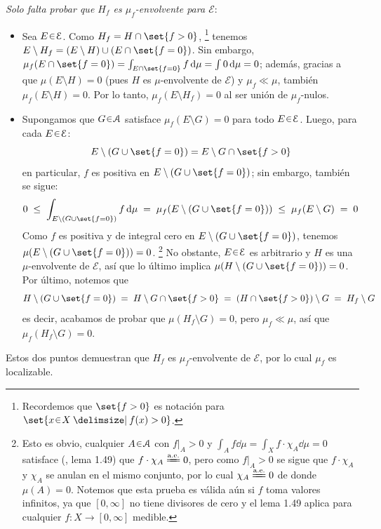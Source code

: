 \begin{sol}
\begin{enumerate}[label = (\roman*), leftmargin=1.8em]
\emph{Solo falta probar que $H_f$ es $\mu_f$-envolvente para $\mathcal{E}$}:
\begin{itemize}[leftmargin=1em]
\item Sea $E\en\mathcal{E}$. Como $H_f = H\cap \set{f>0}$,%
\footnote{
    Recordemos que $\set{f>0}$ es notación para $\set{x\en X \given f(x)>0}$.
}
tenemos $E\setminus H_f = (E \setminus H) \cup (E\cap\set{f=0})$.
Sin embargo, $\mu_f(E\cap\set{f=0}) = \int_{E\cap\set{f=0}}f\dd{\mu} = \int0\dd{\mu}=0$; además, gracias a que $\mu(E\setminus H) = 0$ (pues $H$ es $\mu$-envolvente de $\mathcal{E}$) y $\mu_f \ll \mu$, también $\mu_f(E \setminus H)=0$. Por lo tanto, $\mu_f(E\setminus H_f) = 0$ al ser unión de $\mu_f$-nulos. 
\item 
Supongamos que $G\en\mathcal{A}$ satisface $\mu_f(E\setminus G) = 0$ para todo $E\en\mathcal{E}$. Luego, para cada $E\en\mathcal{E}$:
\[
E \setminus (G\cup \set{f=0}) = E\setminus G \cap \set{f>0}
\]
en particular, $f$ es positiva en $E \setminus (G\cup \set{f=0})$; sin embargo, también se sigue:
\[
0
\;\leq\; \int_{E \setminus (G\cup \set{f=0})}f\dd{\mu}
\;=\; \mu_f(E \setminus (G\cup \set{f=0}))
\;\leq\; \mu_f(E\setminus G)
\;=\; 0
\]
Como $f$ es positiva y de integral cero en $E \setminus (G\cup \set{f=0})$, tenemos $\mu(E \setminus (G\cup \set{f=0}))=0$.%
\footnote{
    Esto es obvio, cualquier $A\en\mathcal{A}$ con $f|_A>0$ y $\int_Af\dd{\mu} = \int_Xf\cdot\chi_A\dd{\mu}=0$ satisface (\cite{Salamon}, lema 1.49) que $f\cdot\chi_A \ctpeq0$, pero como $f|_A >0$ se sigue que $f\cdot\chi_A$ y $\chi_A$ se anulan en el mismo conjunto, por lo cual $\chi_A \ctpeq 0$ de donde $\mu(A)=0$. Notemos que esta prueba es válida aún si $f$ toma valores infinitos, ya que $[0,\infty]$ no tiene divisores de cero y el lema 1.49 aplica para cualquier $f \colon X \to [0,\infty]$ medible.
}
No obstante, $E\en\mathcal{E}$ es arbitrario y $H$ es una $\mu$-envolvente de $\mathcal{E}$, así que lo último implica $\mu(H \setminus (G\cup \set{f=0})) = 0$. Por último, notemos que
\[
H \setminus (G\cup \set{f=0})
\;=\; H \setminus G \cap \set{f>0}
\;=\; (H\cap\set{f>0}) \setminus G
\;=\; H_f \setminus G
\]
es decir, acabamos de probar que $\mu(H_f\setminus G) = 0$, pero $\mu_f \ll \mu$, así que $\mu_f(H_f\setminus G) = 0$.
\end{itemize}
Estos dos puntos demuestran que $H_f$ es $\mu_f$-envolvente de $\mathcal{E}$, por lo cual $\mu_f$ es localizable.
\end{enumerate}
\medskip

\end{sol}
